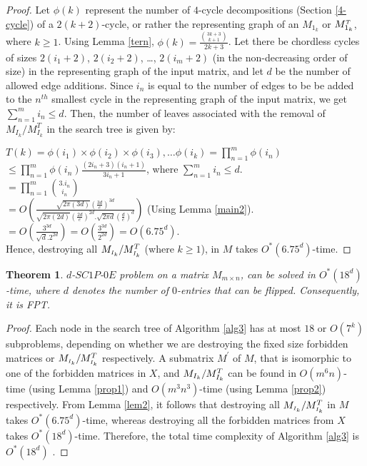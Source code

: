 \documentclass[review, 1p]{elsarticle}
\newtheorem{theorem}{Theorem}
\begin{document}
\begin{proof}
Let $\phi(k)$ represent the number of $4$-cycle decompositions (Section \ref{4-cycle}) of a $2(k + 2)$-cycle, or rather the representing graph of an $M_{1_{k}}$ or $M_{1_{k}}^{\mathsmaller T}$, where $k \geq 1$. Using Lemma \ref{tern}, $\phi(k)= \frac {\binom {3k+3} {k+1}} {2k+3}$. Let there be chordless cycles of sizes $2(i_{1}+2)$, $2(i_{2}+2)$, \ldots, $2(i_{m}+2)$ (in the non-decreasing order of size) in the representing graph of the input matrix, and let $d$ be the number of allowed edge additions. Since $i_{n}$ is equal to the number of edges to be be added to the $n^{th}$ smallest cycle in the representing graph of the input matrix, we get $\sum_{n=1}^{m} i_{n} \leq d$. Then, the number of leaves associated with the removal of $M_{I_{k}}/M_{I_{k}}^{T}$ in the search tree is given by:

$T(k)=\phi(i_{1}) \times \phi(i_{2}) \times \phi(i_{3}), \ldots \phi(i_{k}) =\prod_{n=1}^{m} \phi(i_{n})$\\ 
\indent \indent \indent$\leq \prod_{n=1}^{m} \phi(i_{n}) \frac{(2i_{n}+3)(i_{n}+1)}{3i_{n}+1}$,  where $\sum_{n=1}^{m} i_{n} \leq d$.\\ \vspace{0.05 in}
\indent \indent \indent $= \prod_{n=1}^{m} \binom {3.i_{n}} {i_{n}}$ \\ \vspace{0.05 in}
\indent \indent \indent $=O(\frac{\sqrt{2\pi(3d)}(\frac{3d}{e})^{3d}}{\sqrt{2 \pi(2d)}(\frac{2d}{e})^{2d}.\sqrt{2 \pi d}(\frac{d}{e})^{d}})$ \hspace{0.8 in}(Using Lemma \ref{main2}).\\
\indent \indent \indent$=O(\frac {3^{3d}}{\sqrt{d}. 2^{2d}}) = O(\frac{3^{3d}}{2^{2d}})= O(6.75^{d})$.\\
Hence, destroying all $M_{\mathsmaller I_{k}}/M^{T}_{\mathsmaller I_{k}}$ (where $k \geq 1$), in $M$ takes $O^{*}(6.75^{d})$-time.
\end{proof}
\begin{theorem} \label{rest2}
$d$-$SC1P$-$0E$ problem on a matrix $M_{m \times n}$, can be solved in $O^{*}(18^{d})$-time, where $d$ denotes the number of $0$-entries that can be flipped. Consequently, it is FPT.
\end{theorem}
\begin{proof}
Each node in the search tree of Algorithm \ref{alg3} has at most $18$ or $O(7^{k})$ subproblems, depending on whether we are destroying the fixed size forbidden matrices or $M_{\mathsmaller I_{k}}/M^{T}_{\mathsmaller I_{k}}$ respectively. A submatrix $M^{'}$ of $M$, that is isomorphic to one of the forbidden matrices in $X$, and $M_{I_{k}}/M^{T}_{\tiny I_{k}}$ can be found in $O(m^{6}n)$-time (using Lemma \ref{prop1}) and  $O(m^{3}n^{3})$-time (using Lemma \ref{prop2}) respectively. From Lemma \ref{lem2}, it follows that destroying all $M_{\mathsmaller I_{k}}/M^{T}_{\mathsmaller I_{k}}$ in $M$ takes $O^{*}(6.75^{d})$-time, whereas destroying all the forbidden matrices from $X$ takes $O^{*}(18^{d})$-time.  Therefore, the total time complexity of Algorithm \ref{alg3} is $O^{*}(18^{d})$ . 
\end{proof}
\end{document}
